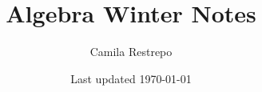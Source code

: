 \documentclass{notes}
\title{\bfseries Algebra Winter Notes}
\author{Camila Restrepo}
\date{Last updated \today}
\begin{document}
\maketitle
\toccontents
\frontpagewarning



\end{document}
